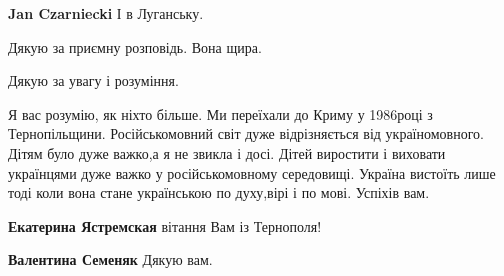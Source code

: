 \begin{itemize}
\begin{itemize}
\textbf{Jan Czarniecki} І в Луганську.
\end{itemize}

 
Дякую за приємну розповідь. Вона щира.

\begin{itemize}
 
Дякую за увагу і розуміння.
\end{itemize}

 

\obeycr
Я вас розумію, як ніхто більше.
Ми переїхали до Криму у 1986році
з Тернопільщини.
Російськомовний світ дуже відрізняється від україномовного.
Дітям було дуже важко,а я не звикла і досі.
Дітей виростити і виховати українцями дуже важко у російськомовному середовищі.
Україна вистоїть лише тоді коли вона стане українською по духу,вірі і по мові.
Успіхів вам.
\restorecr

\begin{itemize}
 
\textbf{Екатерина Ястремская} вітання Вам із Тернополя!

 
\textbf{Валентина Семеняк} Дякую вам.
\end{itemize}


\end{itemize}
